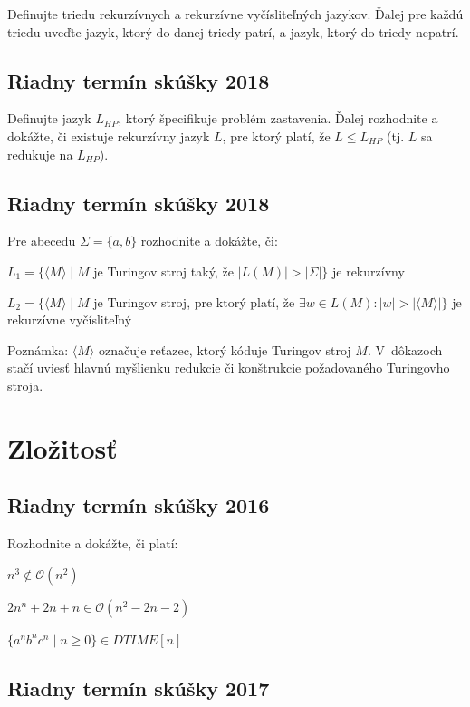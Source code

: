 \documentclass[11pt,a4paper]{article}
\begin{document}
		Definujte triedu rekurzívnych a rekurzívne vyčísliteľných jazykov. Ďalej pre každú triedu uveďte jazyk, ktorý do danej triedy patrí, a jazyk, ktorý do triedy nepatrí.

		\subsection{Riadny termín skúšky 2018}

		Definujte jazyk $L_{HP}$, ktorý špecifikuje problém zastavenia. Ďalej rozhodnite a dokážte, či existuje rekurzívny jazyk $L$, pre ktorý platí, že $L \leq L_{HP}$ (tj. $L$ sa redukuje na $L_{HP}$).

		\subsection{Riadny termín skúšky 2018}

		Pre abecedu $\Sigma = \{a, b\}$ rozhodnite a dokážte, či:

		$L_1 = \{\langle M \rangle \mid M$ je Turingov stroj taký, že $\vert L(M) \vert  > \vert \Sigma \vert\}$ je rekurzívny

		$L_2 = \{\langle M \rangle \mid M$ je Turingov stroj, pre ktorý platí, že $\exists w \in L(M) : \vert w \vert > \vert \langle M \rangle \vert\}$ je rekurzívne vyčísliteľný

		Poznámka: $\langle M \rangle$ označuje reťazec, ktorý kóduje Turingov stroj $M$. V~dôkazoch stačí uviesť hlavnú myšlienku redukcie či konštrukcie požadovaného Turingovho stroja.

	\section{Zložitosť}

		\subsection{Riadny termín skúšky 2016}

		Rozhodnite a dokážte, či platí:

		$n^3 \notin \mathcal{O}(n^2)$

		$2n^n + 2n + n \in \mathcal{O}(n^2 - 2n - 2)$

		$\{a^nb^nc^n \mid n \geq 0\} \in DTIME[n]$

		\subsection{Riadny termín skúšky 2017}
\end{document}
